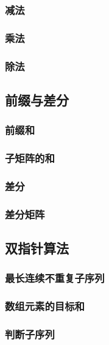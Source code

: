 \documentclass[10pt,a4paper]{article}
\begin{document}
\subsubsection{减法}

\subsubsection{乘法}

\subsubsection{除法}

\subsection{前缀与差分}
\subsubsection{前缀和}

\subsubsection{子矩阵的和}

\subsubsection{差分}

\subsubsection{差分矩阵}

\subsection{双指针算法}
\subsubsection{最长连续不重复子序列}

\subsubsection{数组元素的目标和}

\subsubsection{判断子序列}

\end{document}
